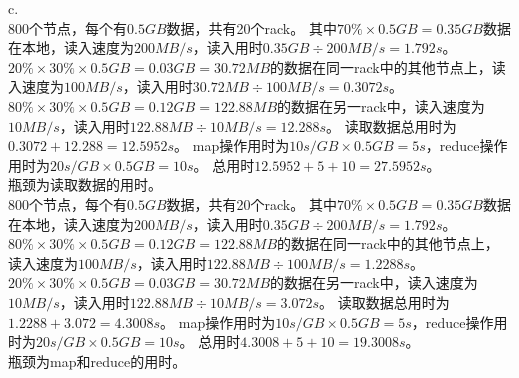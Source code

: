 \documentclass[UTF8]{ctexart}
\begin{document}
c.\\
800个节点，每个有$0.5GB$数据，共有20个rack。
其中$70\%\times0.5GB=0.35GB$数据在本地，读入速度为$200MB/s$，读入用时$0.35GB\div200MB/s=1.792s$。
$20\%\times30\%\times0.5GB=0.03GB=30.72MB$的数据在同一rack中的其他节点上，读入速度为$100MB/s$，读入用时$30.72MB\div100MB/s=0.3072s$。
$80\%\times30\%\times0.5GB=0.12GB=122.88MB$的数据在另一rack中，读入速度为$10MB/s$，读入用时$122.88MB\div10MB/s=12.288s$。
读取数据总用时为$0.3072+12.288=12.5952s$。
map操作用时为$10s/GB\times0.5GB=5s$，reduce操作用时为$20s/GB\times0.5GB=10s$。
总用时$12.5952+5+10=27.5952s$。\\
瓶颈为读取数据的用时。\\

800个节点，每个有$0.5GB$数据，共有20个rack。
其中$70\%\times0.5GB=0.35GB$数据在本地，读入速度为$200MB/s$，读入用时$0.35GB\div200MB/s=1.792s$。
$80\%\times30\%\times0.5GB=0.12GB=122.88MB$的数据在同一rack中的其他节点上，读入速度为$100MB/s$，读入用时$122.88MB\div100MB/s=1.2288s$。
$20\%\times30\%\times0.5GB=0.03GB=30.72MB$的数据在另一rack中，读入速度为$10MB/s$，读入用时$122.88MB\div10MB/s=3.072s$。
读取数据总用时为$1.2288+3.072=4.3008s$。
map操作用时为$10s/GB\times0.5GB=5s$，reduce操作用时为$20s/GB\times0.5GB=10s$。
总用时$4.3008+5+10=19.3008s$。\\
瓶颈为map和reduce的用时。\\
\end{document}
